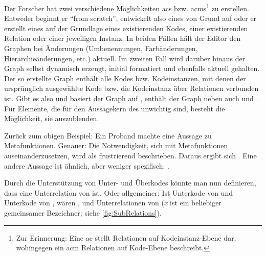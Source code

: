 Der Forscher hat zwei verschiedene Möglichkeiten \glspl{ac} bzw. \glspl{acm}\footnote{Zur Erinnerung: Eine \gls{ac} stellt Relationen auf Kodeinstanz-Ebene dar, wohingegen ein \gls{acm} Relationen auf Kode-Ebene beschreibt.} zu erstellen. Entweder beginnt er ``from scratch'', entwickelt also eines von Grund auf oder er erstellt eines auf der Grundlage eines existierenden Kodes, einer existierenden Relation oder einer jeweiligen Instanz. In beiden Fällen hält der Editor den Graphen bei Änderungen (Umbenennungen, Farbänderungen, Hierarchieänderungen, etc.) aktuell. Im zweiten Fall wird darüber hinaus der Graph selbst dynamisch erzeugt, initial formatiert und ebenfalls aktuell gehalten. Der so erstellte Graph enthält alle Kodes bzw. Kodeinstanzen, mit denen der ursprünglich ausgewählte Kode bzw. die Kodeinstanz über Relationen verbunden ist. Gibt es also  und basiert der Graph auf , enthält der Graph neben  auch  und . Für Elemente, die für den Aussagekern des  unwichtig sind, besteht die Möglichkeit, sie auszublenden.

Zurück zum obigen Beispiel: Ein Proband machte eine Aussage zu Metafunktionen. Genauer: Die Notwendigkeit, sich mit Metafunktionen auseinanderzusetzen, wird als frustrierend beschrieben. Daraus ergibt sich . Eine andere Aussage ist ähnlich, aber weniger spezifisch: .

Durch die Unterstützung von Unter- und Überkodes könnte man nun definieren, dass  eine Unterrelation von  ist. Oder allgemeiner: Ist  Unterkode von  und  Unterkode von , wären ,  und  Unterrelationen von  (\textit{x} ist ein beliebiger gemeinsamer Bezeichner; siehe \autoref{fig:SubRelations}).

